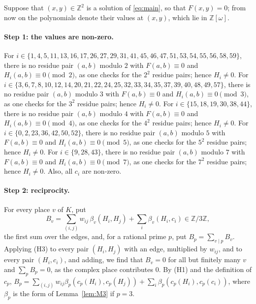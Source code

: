\documentclass[11pt]{article}
\newcommand{\Z}{\mathbb{Z}}
\begin{document}
Suppose that $(x,y)\in\Z^2$ is a solution of \eqref{eq:main}, so that $F(x,y)=0$; from now on the polynomials denote their values at $(x,y)$, which lie in $\Z[\omega]$.
\paragraph{Step 1: the values are non-zero.} For $i\in\{1,\allowbreak 4,\allowbreak 5,\allowbreak 11,\allowbreak 13,\allowbreak 16,\allowbreak 17,\allowbreak 26,\allowbreak 27,\allowbreak 29,\allowbreak 31,\allowbreak 41,\allowbreak 45,\allowbreak 46,\allowbreak 47,\allowbreak 51,\allowbreak 53,\allowbreak 54,\allowbreak 55,\allowbreak 56,\allowbreak 58,\allowbreak 59\}$, there is no residue pair $(a,b)$ modulo $2$ with $F(a,b)\equiv0$ and $H_i(a,b)\equiv0\pmod{2}$, as one checks for the $2^2$ residue pairs; hence $H_i\neq0$. For $i\in\{3,\allowbreak 6,\allowbreak 7,\allowbreak 8,\allowbreak 10,\allowbreak 12,\allowbreak 14,\allowbreak 20,\allowbreak 21,\allowbreak 22,\allowbreak 24,\allowbreak 25,\allowbreak 32,\allowbreak 33,\allowbreak 34,\allowbreak 35,\allowbreak 37,\allowbreak 39,\allowbreak 40,\allowbreak 48,\allowbreak 49,\allowbreak 57\}$, there is no residue pair $(a,b)$ modulo $3$ with $F(a,b)\equiv0$ and $H_i(a,b)\equiv0\pmod{3}$, as one checks for the $3^2$ residue pairs; hence $H_i\neq0$. For $i\in\{15,\allowbreak 18,\allowbreak 19,\allowbreak 30,\allowbreak 38,\allowbreak 44\}$, there is no residue pair $(a,b)$ modulo $4$ with $F(a,b)\equiv0$ and $H_i(a,b)\equiv0\pmod{4}$, as one checks for the $4^2$ residue pairs; hence $H_i\neq0$. For $i\in\{0,\allowbreak 2,\allowbreak 23,\allowbreak 36,\allowbreak 42,\allowbreak 50,\allowbreak 52\}$, there is no residue pair $(a,b)$ modulo $5$ with $F(a,b)\equiv0$ and $H_i(a,b)\equiv0\pmod{5}$, as one checks for the $5^2$ residue pairs; hence $H_i\neq0$. For $i\in\{9,\allowbreak 28,\allowbreak 43\}$, there is no residue pair $(a,b)$ modulo $7$ with $F(a,b)\equiv0$ and $H_i(a,b)\equiv0\pmod{7}$, as one checks for the $7^2$ residue pairs; hence $H_i\neq0$. Also, all $c_i$ are non-zero.

\paragraph{Step 2: reciprocity.} For every place $v$ of $K$, put
\begin{equation}\label{eq:B}
B_v=\sum_{(i,j)}w_{ij}\,\beta_v(H_i,H_j)+\sum_i\beta_v(H_i,c_i)\in\Z/3\Z,
\end{equation}
the first sum over the edges, and, for a rational prime $p$, put $B_p=\sum_{v\mid p}B_v$. Applying (H3) to every pair $(H_i,H_j)$ with an edge, multiplied by $w_{ij}$, and to every pair $(H_i,c_i)$, and adding, we find that $B_v=0$ for all but finitely many $v$ and $\sum_pB_p=0$, as the complex place contributes $0$. By (H1) and the definition of $c_p$, $B_p=\sum_{(i,j)}w_{ij}\beta_p(c_p(H_i),c_p(H_j))+\sum_i\beta_p(c_p(H_i),c_p(c_i))$, where $\beta_p$ is the form of Lemma~\ref{lem:M3} if $p=3$.
\end{document}
